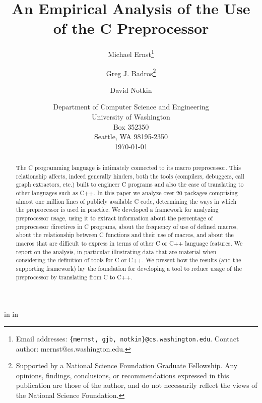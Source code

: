 
\marginparwidth 0pt
\oddsidemargin  0pt
\evensidemargin 0pt
\marginparsep 0pt

\topmargin   0pt

 in
 in




\title{An Empirical Analysis of the Use of the C Preprocessor}

\author{Michael Ernst\thanks{Email 
addresses: {\tt \{mernst, gjb, notkin\}@cs.washington.edu}.  Contact author:
mernst@cs.washington.edu.}
\and Greg J. Badros\thanks{Supported by a National Science Foundation
    Graduate Fellowship. Any opinions, findings, conclusions, or
    recommendations expressed in this publication are those of the
    author, and do not necessarily reflect the views of the National
    Science Foundation.} \and David Notkin}

\date{Department of Computer
Science and Engineering\\
University of Washington\\
Box 352350\\
Seattle, WA  98195-2350\\
\today}  

\maketitle


\begin{abstract}

  The C programming language is intimately connected to its macro
  preprocessor.  This relationship affects, indeed generally hinders,
  both the tools (compilers, debuggers, call graph extractors, etc.)
  built to engineer C programs and also the ease of translating to other
  languages such as C++.  In this paper we analyze over 20 packages
  comprising almost one million lines of publicly available C code, determining
  the ways in which the preprocessor is used in practice.  We developed
  a framework for analyzing preprocessor usage, using it to extract
  information about the percentage of preprocessor directives in C
  programs, about the frequency of use of defined macros, about the
  relationship between C functions and their use of macros, and about
  the macros that are difficult to express in terms of other C or C++
  language features.  We report on the analysis, in particular
  illustrating data that are material when considering the definition of
  tools for C or C++.  We present how the results (and the supporting
  framework) lay the foundation for developing a tool to reduce usage of
  the preprocessor by translating from C to C++.

\end{abstract}

